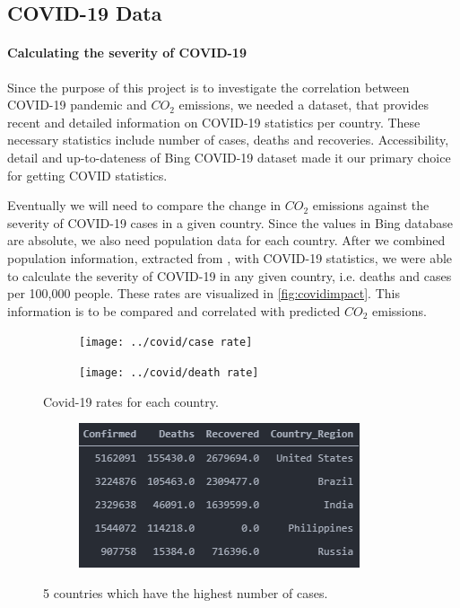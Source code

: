 \subsection{COVID-19 Data}
\paragraph{Calculating the severity of COVID-19}

Since the purpose of this project is to investigate the correlation between COVID-19 pandemic and  $CO_2$ emissions, we needed a dataset, that provides recent and detailed information on COVID-19 statistics per country. These necessary statistics include number of cases, deaths and recoveries. Accessibility, detail and up-to-dateness of Bing COVID-19 dataset \cite{Bing} made it our primary choice for getting COVID statistics.

Eventually we will need to compare the change in $CO_2$ emissions against the severity of COVID-19 cases in a given country. Since the values in Bing database are absolute, we also need population data for each country. After we combined population information, extracted from \cite{PopulationData}, with COVID-19 statistics, we were able to calculate the severity of COVID-19 in any given country, i.e. deaths and cases per 100,000 people. These rates are visualized in \autoref{fig:covidimpact}. This information is to be compared and correlated with predicted $CO_2$ emissions.

\begin{figure}[h]
	\centering
	\begin{subfigure}[b]{0.47\linewidth}
		\texttt{[image: ../covid/case rate]}
	\end{subfigure}
	\begin{subfigure}[b]{0.47\linewidth}
		\texttt{[image: ../covid/death rate]}
	\end{subfigure}
	\caption{Covid-19 rates for each country.}
	\label{fig:covidimpact}
\end{figure}


\begin{figure}[h]
	\centering
	\begin{subfigure}[b]{0.47\linewidth}
		\includegraphics[width=\linewidth]{../covid/bing_top5}
	\end{subfigure}
	\caption{5 countries which have the highest number of cases.}
	\label{fig:bingtop5}
\end{figure}
